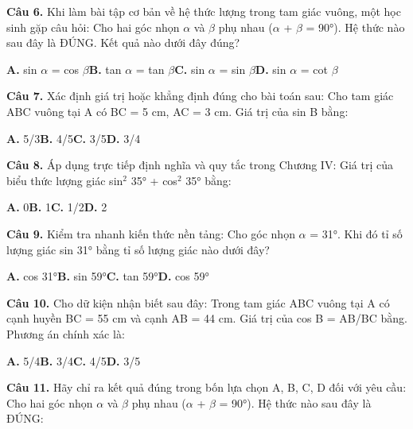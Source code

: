 \documentclass[11pt,a4paper]{article}
\begin{document}
\textbf{\color{primary} Câu 6.} Khi làm bài tập cơ bản về hệ thức lượng trong tam giác vuông, một học sinh gặp câu hỏi: Cho hai góc nhọn $\alpha$ và $\beta$ phụ nhau ($\alpha$ + $\beta$ = 90°). Hệ thức nào sau đây là ĐÚNG. Kết quả nào dưới đây đúng?\par
\hspace*{1.5em}\textbf{A.} sin $\alpha$ = cos $\beta$\quad\quad \textbf{B.} tan $\alpha$ = tan $\beta$\quad\quad \textbf{C.} sin $\alpha$ = sin $\beta$\quad\quad \textbf{D.} sin $\alpha$ = cot $\beta$\par\vspace{2pt}
\textbf{\color{primary} Câu 7.} Xác định giá trị hoặc khẳng định đúng cho bài toán sau: Cho tam giác ABC vuông tại A có BC = 5 cm, AC = 3 cm. Giá trị của sin B bằng:\par
\hspace*{1.5em}\textbf{A.} 5/3\quad\quad \textbf{B.} 4/5\quad\quad \textbf{C.} 3/5\quad\quad \textbf{D.} 3/4\par\vspace{2pt}
\textbf{\color{primary} Câu 8.} Áp dụng trực tiếp định nghĩa và quy tắc trong Chương IV: Giá trị của biểu thức lượng giác sin$^2$ 35° + cos$^2$ 35° bằng:\par
\hspace*{1.5em}\textbf{A.} 0\quad\quad \textbf{B.} 1\quad\quad \textbf{C.} 1/2\quad\quad \textbf{D.} 2\par\vspace{2pt}
\textbf{\color{primary} Câu 9.} Kiểm tra nhanh kiến thức nền tảng: Cho góc nhọn $\alpha$ = 31°. Khi đó tỉ số lượng giác sin 31° bằng tỉ số lượng giác nào dưới đây?\par
\hspace*{1.5em}\textbf{A.} cos 31°\quad\quad \textbf{B.} sin 59°\quad\quad \textbf{C.} tan 59°\quad\quad \textbf{D.} cos 59°\par\vspace{2pt}
\textbf{\color{primary} Câu 10.} Cho dữ kiện nhận biết sau đây: Trong tam giác ABC vuông tại A có cạnh huyền BC = 55 cm và cạnh AB = 44 cm. Giá trị của cos B = AB/BC bằng. Phương án chính xác là:\par
\hspace*{1.5em}\textbf{A.} 5/4\quad\quad \textbf{B.} 3/4\quad\quad \textbf{C.} 4/5\quad\quad \textbf{D.} 3/5\par\vspace{2pt}
\textbf{\color{primary} Câu 11.} Hãy chỉ ra kết quả đúng trong bốn lựa chọn A, B, C, D đối với yêu cầu: Cho hai góc nhọn $\alpha$ và $\beta$ phụ nhau ($\alpha$ + $\beta$ = 90°). Hệ thức nào sau đây là ĐÚNG:\par
\end{document}
